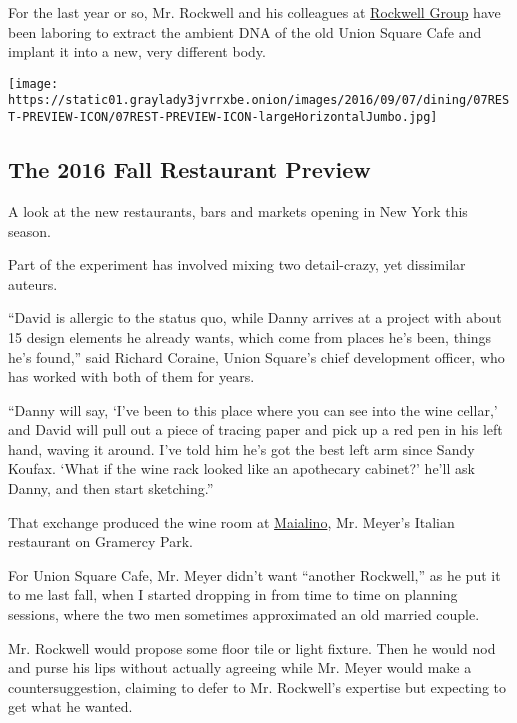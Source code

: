 For the last year or so, Mr. Rockwell and his colleagues at
\href{http://www.rockwellgroup.com/}{Rockwell Group} have been laboring
to extract the ambient DNA of the old Union Square Cafe and implant it
into a new, very different body.

\href{https://www.nytimes3xbfgragh.onion/interactive/2016/09/07/dining/new-york-restaurants-fall-openings.html}{}

\texttt{[image: https://static01.graylady3jvrrxbe.onion/images/2016/09/07/dining/07REST-PREVIEW-ICON/07REST-PREVIEW-ICON-largeHorizontalJumbo.jpg]}

\hypertarget{the-2016-fall-restaurant-preview}{%
\subsection{The 2016 Fall Restaurant
Preview}\label{the-2016-fall-restaurant-preview}}

A look at the new restaurants, bars and markets opening in New York this
season.

Part of the experiment has involved mixing two detail-crazy, yet
dissimilar auteurs.

``David is allergic to the status quo, while Danny arrives at a project
with about 15 design elements he already wants, which come from places
he's been, things he's found,'' said Richard Coraine, Union Square's
chief development officer, who has worked with both of them for years.

``Danny will say, `I've been to this place where you can see into the
wine cellar,' and David will pull out a piece of tracing paper and pick
up a red pen in his left hand, waving it around. I've told him he's got
the best left arm since Sandy Koufax. `What if the wine rack looked like
an apothecary cabinet?' he'll ask Danny, and then start sketching.''

That exchange produced the wine room at
\href{http://www.nytimes3xbfgragh.onion/2010/01/20/dining/reviews/20rest.html}{Maialino},
Mr. Meyer's Italian restaurant on Gramercy Park.

For Union Square Cafe, Mr. Meyer didn't want ``another Rockwell,'' as he
put it to me last fall, when I started dropping in from time to time on
planning sessions, where the two men sometimes approximated an old
married couple.

Mr. Rockwell would propose some floor tile or light fixture. Then he
would nod and purse his lips without actually agreeing while Mr. Meyer
would make a countersuggestion, claiming to defer to Mr. Rockwell's
expertise but expecting to get what he wanted.

